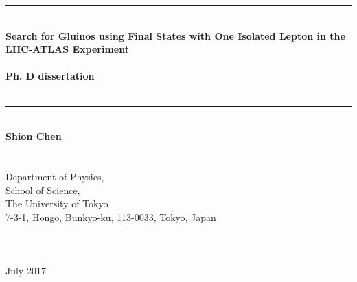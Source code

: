 \newcommand\HRule{\rule{\textwidth}{1pt}}

\topmargin =30mm


\begin{titlepage}


\begin{center}



\HRule \\[0.4cm]
\textbf{ \fontsize{18.0pt}{23pt}\selectfont 
Search for Gluinos using Final States with One Isolated Lepton in the LHC-ATLAS Experiment 
\\ \mbox{} \\
\fontsize{15.0pt}{30pt}\selectfont 
Ph. D dissertation \\ 
}  \mbox{} \\[0.4cm]
\HRule \\[4cm]


\fontsize{17.0pt}{20pt}\selectfont \textbf{Shion Chen}  \\ \mbox{}  \\ \mbox{} \\ 
\fontsize{14.0pt}{20pt}\selectfont 
Department of Physics, \\ 
School of Science, \\
The University of Tokyo \\
7-3-1, Hongo, Bunkyo-ku, 113-0033, Tokyo, Japan \\ \mbox{} \\ \mbox{} \\ \mbox{} \\ 
July 2017
%




\end{center}

\end{titlepage}


\clearpage
\topmargin =-13mm
